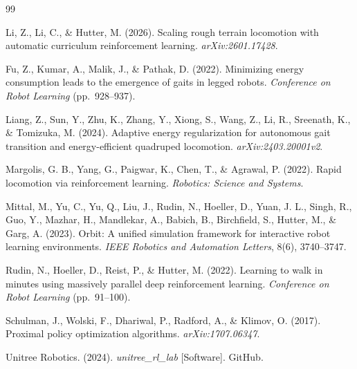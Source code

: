 \begin{thebibliography}{99}

Li, Z., Li, C., \& Hutter, M. (2026).
Scaling rough terrain locomotion with automatic curriculum reinforcement learning.
\textit{arXiv:2601.17428}.

Fu, Z., Kumar, A., Malik, J., \& Pathak, D. (2022).
Minimizing energy consumption leads to the emergence of gaits in legged robots.
\textit{Conference on Robot Learning} (pp.\ 928--937).

Liang, Z., Sun, Y., Zhu, K., Zhang, Y., Xiong, S., Wang, Z., Li, R., Sreenath, K., \& Tomizuka, M. (2024).
Adaptive energy regularization for autonomous gait transition and energy-efficient quadruped locomotion.
\textit{arXiv:2403.20001v2}.

Margolis, G. B., Yang, G., Paigwar, K., Chen, T., \& Agrawal, P. (2022).
Rapid locomotion via reinforcement learning.
\textit{Robotics: Science and Systems}.

Mittal, M., Yu, C., Yu, Q., Liu, J., Rudin, N., Hoeller, D., Yuan, J. L., Singh, R., Guo, Y., Mazhar, H., Mandlekar, A., Babich, B., Birchfield, S., Hutter, M., \& Garg, A. (2023).
Orbit: A unified simulation framework for interactive robot learning environments.
\textit{IEEE Robotics and Automation Letters}, 8(6), 3740--3747.

Rudin, N., Hoeller, D., Reist, P., \& Hutter, M. (2022).
Learning to walk in minutes using massively parallel deep reinforcement learning.
\textit{Conference on Robot Learning} (pp.\ 91--100).

Schulman, J., Wolski, F., Dhariwal, P., Radford, A., \& Klimov, O. (2017).
Proximal policy optimization algorithms.
\textit{arXiv:1707.06347}.

Unitree Robotics. (2024).
\textit{unitree\_rl\_lab} [Software]. GitHub.

\end{thebibliography}
